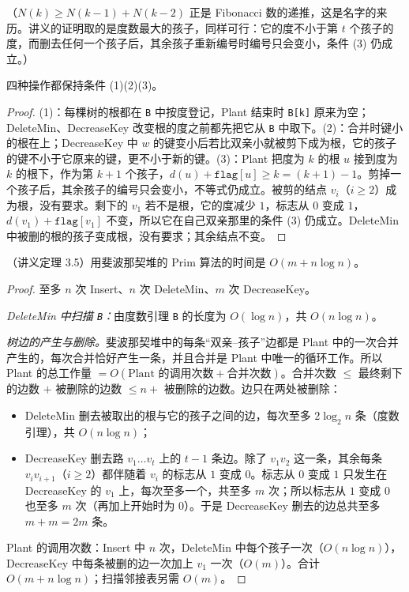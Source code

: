 （$N(k)\geqslant N(k-1)+N(k-2)$ 正是 Fibonacci 数的递推，这是名字的来历。讲义的证明取的是度数最大的孩子，同样可行：它的度不小于第 $t$ 个孩子的度，而删去任何一个孩子后，其余孩子重新编号时编号只会变小，条件 (3) 仍成立。）

\begin{proposition}\label{prop:mst-prim:invariants}
四种操作都保持条件 (1)(2)(3)。
\end{proposition}
\begin{proof}
(1)：每棵树的根都在 \texttt{B} 中按度登记，Plant 结束时 \texttt{B[k]} 原来为空；DeleteMin、DecreaseKey 改变根的度之前都先把它从 \texttt{B} 中取下。(2)：合并时键小的根在上；DecreaseKey 中 $w$ 的键变小后若比双亲小就被剪下成为根，它的孩子的键不小于它原来的键，更不小于新的键。(3)：Plant 把度为 $k$ 的根 $u$ 接到度为 $k$ 的根下，作为第 $k+1$ 个孩子，$d(u)+\texttt{flag}[u]\geqslant k=(k+1)-1$。剪掉一个孩子后，其余孩子的编号只会变小，不等式仍成立。被剪的结点 $v_i$（$i\geqslant2$）成为根，没有要求。剩下的 $v_1$ 若不是根，它的度减少 $1$，标志从 $0$ 变成 $1$，$d(v_1)+\texttt{flag}[v_1]$ 不变，所以它在自己双亲那里的条件 (3) 仍成立。DeleteMin 中被删的根的孩子变成根，没有要求；其余结点不变。
\end{proof}

\begin{theorem}\label{thm:mst-prim:fib}
（讲义定理 3.5）用斐波那契堆的 Prim 算法的时间是 $O(m+n\log n)$。
\end{theorem}
\begin{proof}
至多 $n$ 次 Insert、$n$ 次 DeleteMin、$m$ 次 DecreaseKey。

\emph{DeleteMin 中扫描 \texttt{B}：}由度数引理 \texttt{B} 的长度为 $O(\log n)$，共 $O(n\log n)$。

\emph{树边的产生与删除。}斐波那契堆中的每条“双亲–孩子”边都是 Plant 中的一次合并产生的，每次合并恰好产生一条，并且合并是 Plant 中唯一的循环工作。所以 Plant 的总工作量 $=O(\text{Plant 的调用次数}+\text{合并次数})$。合并次数 $\leqslant$ 最终剩下的边数 $+$ 被删除的边数 $\leqslant n+$ 被删除的边数。边只在两处被删除：
\begin{itemize}
\item DeleteMin 删去被取出的根与它的孩子之间的边，每次至多 $2\log_2n$ 条（度数引理），共 $O(n\log n)$；
\item DecreaseKey 删去路 $v_1\dots v_t$ 上的 $t-1$ 条边。除了 $v_1v_2$ 这一条，其余每条 $v_iv_{i+1}$（$i\geqslant2$）都伴随着 $v_i$ 的标志从 $1$ 变成 $0$。标志从 $0$ 变成 $1$ 只发生在 DecreaseKey 的 $v_1$ 上，每次至多一个，共至多 $m$ 次；所以标志从 $1$ 变成 $0$ 也至多 $m$ 次（再加上开始时为 $0$）。于是 DecreaseKey 删去的边总共至多 $m+m=2m$ 条。
\end{itemize}
Plant 的调用次数：Insert 中 $n$ 次，DeleteMin 中每个孩子一次（$O(n\log n)$），DecreaseKey 中每条被删的边一次加上 $v_1$ 一次（$O(m)$）。合计 $O(m+n\log n)$；扫描邻接表另需 $O(m)$。
\end{proof}

